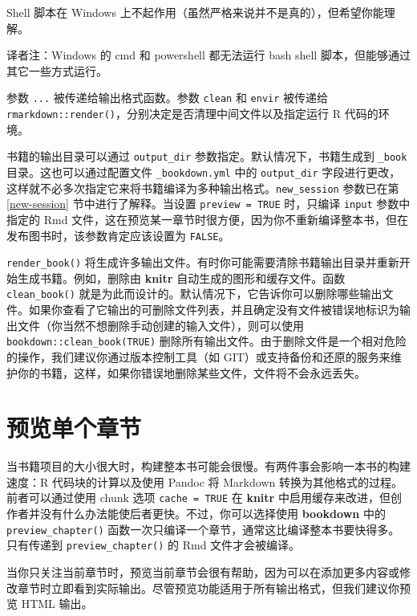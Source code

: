 \documentclass[
  12pt,
]{krantz}
\renewenvironment{quote}{\begin{VF}}{\end{VF}}
\theoremstyle{definition}
\theoremstyle{definition}
\theoremstyle{definition}
\theoremstyle{definition}
\theoremstyle{remark}
\begin{document}
Shell 脚本在 Windows 上不起作用（虽然严格来说并不是真的），但希望你能理解。

\begin{quote}
译者注：Windows 的 cmd 和 powershell 都无法运行 bash shell 脚本，但能够通过其它一些方式运行。
\end{quote}

参数 \texttt{...} 被传递给输出格式函数。参数 \texttt{clean} 和 \texttt{envir} 被传递给 \texttt{rmarkdown::render()}，分别决定是否清理中间文件以及指定运行 R 代码的环境。

书籍的输出目录可以通过 \texttt{output\_dir} 参数指定。默认情况下，书籍生成到 \texttt{\_book} 目录。这也可以通过配置文件 \texttt{\_bookdown.yml} 中的 \texttt{output\_dir} 字段进行更改，这样就不必多次指定它来将书籍编译为多种输出格式。\texttt{new\_session} 参数已在第 \ref{new-session} 节中进行了解释。当设置 \texttt{preview\ =\ TRUE} 时，只编译 \texttt{input} 参数中指定的 Rmd 文件，这在预览某一章节时很方便，因为你不重新编译整本书，但在发布图书时，该参数肯定应该设置为 \texttt{FALSE}。

\texttt{render\_book()} 将生成许多输出文件。有时你可能需要清除书籍输出目录并重新开始生成书籍。例如，删除由 \textbf{knitr} 自动生成的图形和缓存文件。函数 \texttt{clean\_book()} 就是为此而设计的。默认情况下，它告诉你可以删除哪些输出文件。如果你查看了它输出的可删除文件列表，并且确定没有文件被错误地标识为输出文件（你当然不想删除手动创建的输入文件），则可以使用 \texttt{bookdown::clean\_book(TRUE)} 删除所有输出文件。由于删除文件是一个相对危险的操作，我们建议你通过版本控制工具（如 GIT）或支持备份和还原的服务来维护你的书籍，这样，如果你错误地删除某些文件，文件将不会永远丢失。

\section{预览单个章节}\label{ux9884ux89c8ux5355ux4e2aux7ae0ux8282}

当书籍项目的大小很大时，构建整本书可能会很慢。有两件事会影响一本书的构建速度：R 代码块的计算以及使用 Pandoc 将 Markdown 转换为其他格式的过程。前者可以通过使用 chunk 选项 \texttt{cache\ =\ TRUE} 在 \textbf{knitr} 中启用缓存来改进，但创作者并没有什么办法能使后者更快。不过，你可以选择使用 \textbf{bookdown} 中的 \texttt{preview\_chapter()} 函数一次只编译一个章节，通常这比编译整本书要快得多。只有传递到 \texttt{preview\_chapter()} 的 Rmd 文件才会被编译。

当你只关注当前章节时，预览当前章节会很有帮助，因为可以在添加更多内容或修改章节时立即看到实际输出。尽管预览功能适用于所有输出格式，但我们建议你预览 HTML 输出。
\end{document}
